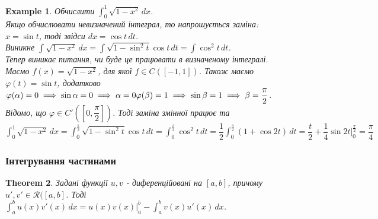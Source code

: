 \documentclass[a4paper, 10pt]{article}
\makeatletter
\def\huge{\displaystyle}
\def\qed{$\blacksquare$}
\theoremstyle{theoremdd}
\newtheorem{theorem}{Theorem}[subsection]
\theoremstyle{theoremdd}
\theoremstyle{theoremdd}
\theoremstyle{theoremdd}
\theoremstyle{theoremdd}
\newtheorem{example}[theorem]{Example}
\theoremstyle{theoremdd}
\theoremstyle{theoremdd}
\theoremstyle{theoremdd}
\theoremstyle{theoremdd}
\renewenvironment{proof}[1][Proof.\\]{\par
\pushQED{\hfill \qed}%
\normalfont \topsep6\p@\@plus6\p@\relax
\trivlist
\item\relax
{\bfseries
#1\@addpunct{.}}\hspace\labelsep\ignorespaces
}{%
\popQED\endtrivlist\@endpefalse
}
\makeatother
\begin{document}

\begin{example}
Обчислити $\huge\int_0^1 \sqrt{1-x^2}\,dx$.\\
Якщо обчислювати невизначений інтеграл, то напрошується заміна: \\
$x = \sin t$, тоді звідси $dx = \cos t \,dt$.\\
Виникне $\huge\int \sqrt{1-x^2}\,dx = \int \sqrt{1-\sin^2 t} \cos t\,dt = \int \cos^2 t\,dt$.\\
Тепер виникає питання, чи буде це працювати в визначеному інтегралі.\\
Маємо $f(x) = \sqrt{1-x^2}$, для якої $f \in C([-1,1])$. Також маємо $\varphi(t) = \sin t$, додатково \\
$\varphi(\alpha) = 0 \implies \sin \alpha = 0 \implies \alpha = 0 \\
\varphi(\beta) = 1 \implies \sin \beta = 1 \implies \beta = \dfrac{\pi}{2}$.\\ Відомо, що $\varphi \in C'\left(\left[0,\dfrac{\pi}{2}\right]\right)$. Тоді заміна змінної працює та\\
$\huge\int_0^1 \sqrt{1-x^2}\,dx = \int_0^{\frac{\pi}{2}} \sqrt{1-\sin^2 t} \cos t \,dt = \int_0^{\frac{\pi}{2}} \cos^2 t\,dt = \dfrac{1}{2} \int_0^{\frac{\pi}{2}} (1+\cos 2t)\,dt = \dfrac{t}{2} + \dfrac{1}{4} \sin 2t \Big|_0^{\frac{\pi}{2}} = \dfrac{\pi}{4}$
\end{example}

\subsubsection{Інтегрування частинами}
\begin{theorem}
Задані функції $u,v$ - диференційовані на $[a,b]$, причому $u',v' \in \mathcal{R}([a,b]$. Тоді \\
$\huge\int_a^b u(x)v'(x)\,dx = u(x)v(x) \Big|_a^b - \int_a^b v(x)u'(x)\,dx$.
\end{theorem}
\end{document}
